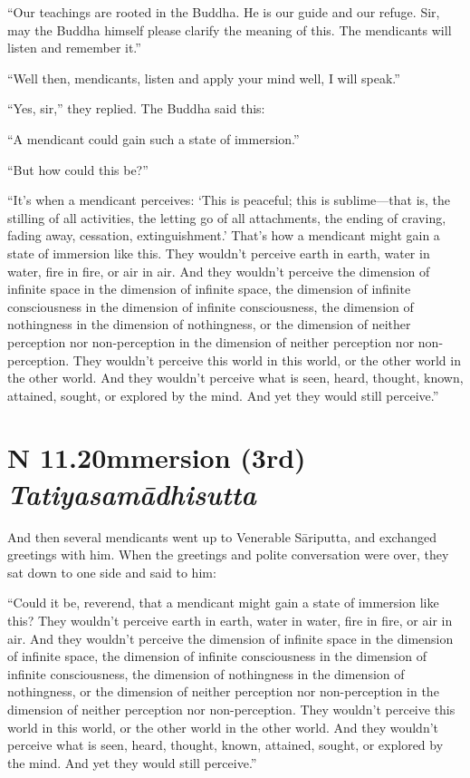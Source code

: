 \documentclass[12pt,openany]{book}%
\newcommand*{\suttatitleacronym}[1]{\smaller[2]{#1}\vspace*{.3em}}
\newcommand*{\suttatitletranslation}[1]{\linebreak{#1}}
\newcommand*{\suttatitleroot}[1]{\linebreak\smaller[2]\itshape{#1}}
\newcommand*{\tocacronym}[1]{\hspace*{-3.3em}{#1}\quad}
\newcommand*{\toctranslation}[1]{#1}
\newcommand*{\tocroot}[1]{(\textit{#1})}
\begin{document}
“Our teachings are rooted in the Buddha. He is our guide and our refuge. Sir, may the Buddha himself please clarify the meaning of this. The mendicants will listen and remember it.” 

“Well then, mendicants, listen and apply your mind well, I will speak.” 

“Yes, sir,” they replied. The Buddha said this: 

“A mendicant could gain such a state of immersion.” 

“But how could this be?” 

“It’s when a mendicant perceives: ‘This is peaceful; this is sublime—that is, the stilling of all activities, the letting go of all attachments, the ending of craving, fading away, cessation, extinguishment.’ That’s how a mendicant might gain a state of immersion like this. They wouldn’t perceive earth in earth, water in water, fire in fire, or air in air. And they wouldn’t perceive the dimension of infinite space in the dimension of infinite space, the dimension of infinite consciousness in the dimension of infinite consciousness, the dimension of nothingness in the dimension of nothingness, or the dimension of neither perception nor non-perception in the dimension of neither perception nor non-perception. They wouldn’t perceive this world in this world, or the other world in the other world. And they wouldn’t perceive what is seen, heard, thought, known, attained, sought, or explored by the mind. And yet they would still perceive.” 

%
\section*{{\suttatitleacronym AN 11.20}{\suttatitletranslation Immersion (3rd) }{\suttatitleroot Tatiyasamādhisutta}}
\addcontentsline{toc}{section}{\tocacronym{AN 11.20} \toctranslation{Immersion (3rd) } \tocroot{Tatiyasamādhisutta}}

And then several mendicants went up to Venerable \textsanskrit{Sāriputta}, and exchanged greetings with him. When the greetings and polite conversation were over, they sat down to one side and said to him: 

“Could it be, reverend, that a mendicant might gain a state of immersion like this? They wouldn’t perceive earth in earth, water in water, fire in fire, or air in air. And they wouldn’t perceive the dimension of infinite space in the dimension of infinite space, the dimension of infinite consciousness in the dimension of infinite consciousness, the dimension of nothingness in the dimension of nothingness, or the dimension of neither perception nor non-perception in the dimension of neither perception nor non-perception. They wouldn’t perceive this world in this world, or the other world in the other world. And they wouldn’t perceive what is seen, heard, thought, known, attained, sought, or explored by the mind. And yet they would still perceive.” 
\end{document}
